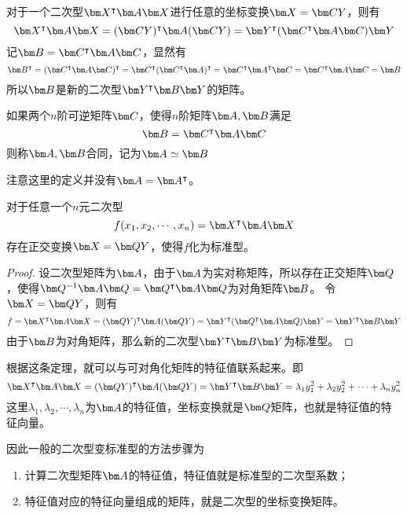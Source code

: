 对于一个二次型$\mat{X}^\intercal \mat{A}\mat{X}$进行任意的坐标变换$\mat{X}=\mat{CY}$，则有
\[ \mat{X}^\intercal \mat{A}\mat{X} = (\mat{CY})^\intercal \mat{A} (\mat{CY}) = \mat{Y}^\intercal (\mat{C}^\intercal \mat{A} \mat{C})\mat{Y} \]
记$\mat{B}=\mat{C}^\intercal \mat{A} \mat{C}$，显然有
\[ \mat{B}^\intercal = (\mat{C}^\intercal \mat{A} \mat{C})^\intercal = \mat{C}^\intercal (\mat{C}^\intercal \mat{A})^\intercal = \mat{C}^\intercal \mat{A}^\intercal \mat{C} = \mat{C}^\intercal \mat{A}\mat{C} = \mat{B} \]
所以$\mat{B}$是新的二次型$\mat{Y}^\intercal \mat{B}\mat{Y}$的矩阵。

\begin{definition}
    如果两个$n$阶可逆矩阵$\mat{C}$，使得$n$阶矩阵$\mat{A},\mat{B}$满足
    \[ \mat{B} = \mat{C}^\intercal \mat{A} \mat{C} \]
    则称$\mat{A},\mat{B}$合同，记为$\mat{A}\simeq \mat{B}$
\end{definition}
注意这里的定义并没有$\mat{A}=\mat{A}^\intercal$。

\begin{theorem}
    对于任意一个$n$元二次型
    \[ f(x_1,x_2,\cdots,x_n) = \mat{X}^\intercal \mat{A}\mat{X} \]
    存在正交变换$\mat{X}=\mat{QY}$，使得$f$化为标准型。
\end{theorem}
\begin{proof}
    设二次型矩阵为$\mat{A}$，由于$\mat{A}$为实对称矩阵，所以存在正交矩阵$\mat{Q}$，使得$\mat{Q}^{-1}\mat{A}\mat{Q} =  \mat{Q}^\intercal \mat{A}\mat{Q}$为对角矩阵$\mat{B}$。
    令$\mat{X}=\mat{QY}$，则有
    \[f = \mat{X}^\intercal \mat{A}\mat{X} = (\mat{QY})^\intercal \mat{A} (\mat{QY}) = \mat{Y}^\intercal (\mat{Q}^\intercal \mat{A}\mat{Q}) \mat{Y} = \mat{Y}^\intercal \mat{B}\mat{Y}\]
    由于$\mat{B}$为对角矩阵，那么新的二次型$\mat{Y}^\intercal \mat{B} \mat{Y}$为标准型。
\end{proof}

根据这条定理，就可以与可对角化矩阵的特征值联系起来。即
\begin{equation}
    \mat{X}^\intercal \mat{A}\mat{X} = (\mat{QY})^\intercal \mat{A} (\mat{QY}) = \mat{Y}^\intercal \mat{B} \mat{Y} = \lambda_1y_1^2+\lambda_2y_2^2+\cdots+\lambda_ny_n^2
\end{equation}
这里$\lambda_1,\lambda_2,\cdots,\lambda_n$为$\mat{A}$的特征值，坐标变换就是$\mat{Q}$矩阵，也就是特征值的特征向量。

因此一般的二次型变标准型的方法步骤为
\begin{enumerate}
    \item 计算二次型矩阵$\mat{A}$的特征值，特征值就是标准型的二次型系数；
    \item 特征值对应的特征向量组成的矩阵，就是二次型的坐标变换矩阵。
\end{enumerate}

